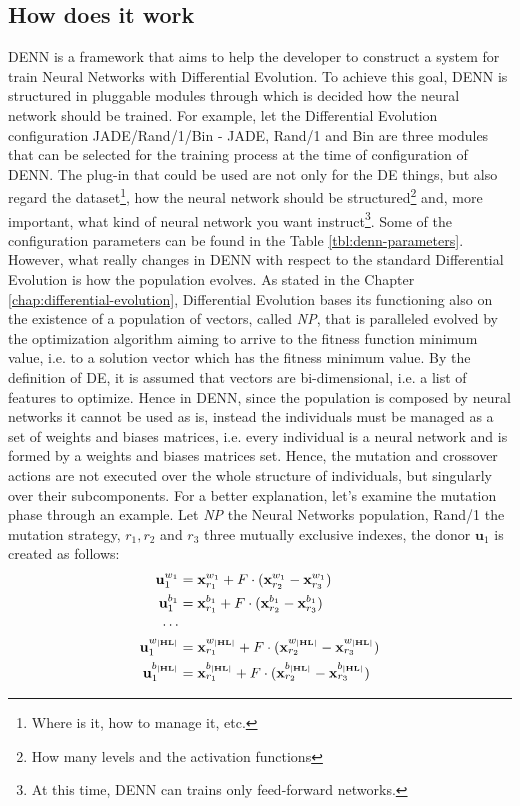 \subsection{How does it work}
DENN is a framework that aims to help the developer to construct a system for train Neural Networks with Differential Evolution. To achieve this goal, DENN is structured in pluggable modules through which is decided how the neural network should be trained. For example, let the Differential Evolution configuration JADE/Rand/1/Bin - JADE, Rand/1 and Bin are three modules that can be selected for the training process at the time of configuration of DENN. The plug-in that could be used are not only for the DE things, but also regard the dataset\footnote{Where is it, how to manage it, etc.}, how the neural network should be structured\footnote{How many levels and the activation functions} and, more important, what kind of neural network you want instruct\footnote{At this time, DENN can trains only feed-forward networks.}. Some of the configuration parameters can be found in the Table \ref{tbl:denn-parameters}.\newline\newline
However, what really changes in DENN with respect to the standard Differential Evolution is how the population evolves. As stated in the Chapter \ref{chap:differential-evolution}, Differential Evolution bases its functioning also on the existence of a population of vectors, called \textit{NP}, that is paralleled evolved by the optimization algorithm aiming to arrive to the fitness function minimum value, i.e. to a solution vector which has the fitness minimum value. By the definition of DE, it is assumed that vectors are bi-dimensional, i.e. a list of features to optimize. Hence in DENN, since the population is composed by neural networks it cannot be used as is, instead the individuals must be managed as a set of weights and biases matrices, i.e. every individual is a neural network and is formed by a weights and biases matrices set. Hence, the mutation and crossover actions are not executed over the whole structure of individuals, but singularly over their subcomponents.\newline\newline
For a better explanation, let's examine the mutation phase through an example. Let \textit{NP} the Neural Networks population, Rand/1 the mutation strategy, $r_1, r_2$ and $r_3$ three mutually exclusive indexes, the donor $\textbf{u}_{1}$ is created as follows:
\begin{align}
	\textbf{u}_{1}^{w_1} &= \textbf{x}_{r_1}^{w_1} + F \cdot (\textbf{x}_{r_2}^{w_1} - \textbf{x}_{r_3}^{w_1}) \\
	\textbf{u}_{1}^{b_1} &= \textbf{x}_{r_1}^{b_1} + F \cdot (\textbf{x}_{r_2}^{b_1} - \textbf{x}_{r_3}^{b_1}) \\
	\cdots \cr
	\textbf{u}_{1}^{w_{|\textbf{HL}|}} &= \textbf{x}_{r_1}^{w_{|\textbf{HL}|}} + F \cdot (\textbf{x}_{r_2}^{w_{|\textbf{HL}|}} - \textbf{x}_{r_3}^{w_{|\textbf{HL}|}}) \\
	\textbf{u}_{1}^{b_{|\textbf{HL}|}} &= \textbf{x}_{r_1}^{b_{|\textbf{HL}|}} + F \cdot (\textbf{x}_{r_2}^{b_{|\textbf{HL}|}} - \textbf{x}_{r_3}^{b_{|\textbf{HL}|}})
\end{align}
